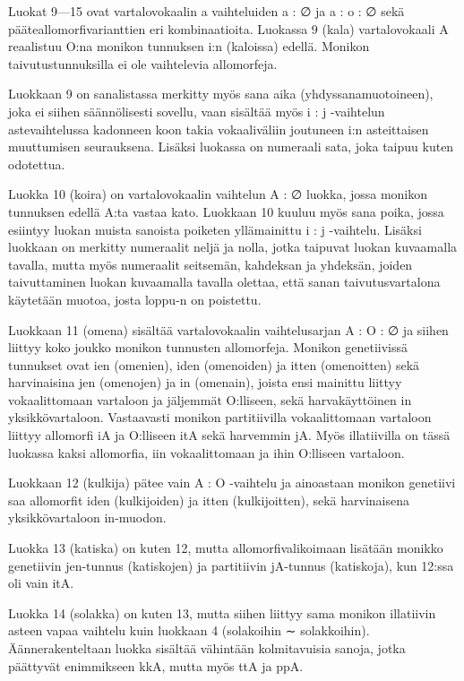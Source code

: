 \documentclass[free]{flammie}
\begin{document}
Luokat 9—15 ovat vartalovokaalin a vaihteluiden a : ∅ ja a : o : ∅ sekä pääteallomorfivarianttien eri kombinaatioita.
Luokassa 9 (kala) vartalovokaali A reaalistuu O:na monikon tunnuksen i:n (kaloissa) edellä. Monikon taivutustunnuksilla ei ole vaihtelevia allomorfeja.

Luokkaan 9 on sanalistassa merkitty myös sana aika (yhdyssanamuotoineen), joka ei siihen säännölisesti sovellu, vaan sisältää myös i : j -vaihtelun astevaihtelussa kadonneen koon takia vokaaliväliin joutuneen i:n asteittaisen muuttumisen
seurauksena. Lisäksi luokassa on numeraali sata, joka taipuu kuten odotettua.

Luokka 10 (koira) on vartalovokaalin vaihtelun A : ∅ luokka, jossa monikon tunnuksen edellä A:ta vastaa kato. Luokkaan 10 kuuluu myös sana poika, jossa esiintyy luokan muista sanoista poiketen yllämainittu i : j -vaihtelu. Lisäksi luokkaan
on merkitty numeraalit neljä ja nolla, jotka taipuvat luokan kuvaamalla tavalla,
mutta myös numeraalit seitsemän, kahdeksan ja yhdeksän, joiden taivuttaminen
luokan kuvaamalla tavalla olettaa, että sanan taivutusvartalona käytetään muotoa,
josta loppu-n on poistettu.

Luokkaan 11 (omena) sisältää vartalovokaalin vaihtelusarjan A : O : ∅ ja siihen
liittyy koko joukko monikon tunnusten allomorfeja. Monikon genetiivissä tunnukset ovat ien (omenien), iden (omenoiden) ja itten (omenoitten) sekä harvinaisina
jen (omenojen) ja in (omenain), joista ensi mainittu liittyy vokaalittomaan vartaloon ja jäljemmät O:lliseen, sekä harvakäyttöinen in yksikkövartaloon. Vastaavasti monikon partitiivilla vokaalittomaan vartaloon liittyy allomorfi iA ja O:lliseen
itA sekä harvemmin jA. Myös illatiivilla on tässä luokassa kaksi allomorfia, iin
vokaalittomaan ja ihin O:lliseen vartaloon.

Luokkaan 12 (kulkija) pätee vain A : O -vaihtelu ja ainoastaan monikon genetiivi
saa allomorfit iden (kulkijoiden) ja itten (kulkijoitten), sekä harvinaisena yksikkövartaloon in-muodon.

Luokka 13 (katiska) on kuten 12, mutta allomorfivalikoimaan lisätään monikko
genetiivin jen-tunnus (katiskojen) ja partitiivin jA-tunnus (katiskoja), kun 12:ssa
oli vain itA.

Luokka 14 (solakka) on kuten 13, mutta siihen liittyy sama monikon illatiivin asteen vapaa vaihtelu kuin luokkaan 4 (solakoihin ∼ solakkoihin). Äännerakenteltaan luokka sisältää vähintään kolmitavuisia sanoja, jotka päättyvät enimmikseen
kkA, mutta myös ttA ja ppA.
\end{document}
